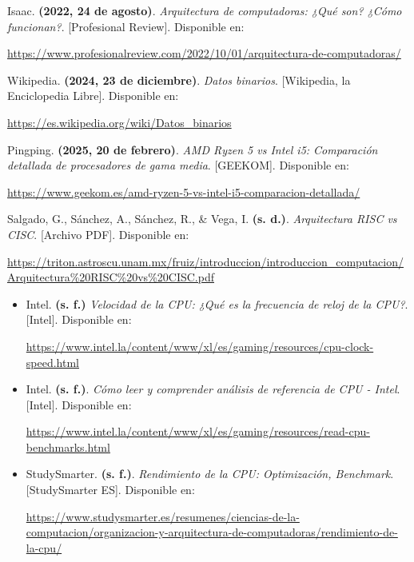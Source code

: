 \documentclass[12pt,letterpaper]{article}
\begin{document}
\begin{thebibliography}{9}

  Isaac. \textbf{(2022, 24 de agosto)}. \textit{Arquitectura de computadoras: ¿Qué son? ¿Cómo funcionan?}. [Profesional Review]. Disponible en:

  \url{https://www.profesionalreview.com/2022/10/01/arquitectura-de-computadoras/}
  
  Wikipedia. \textbf{(2024, 23 de diciembre)}. \textit{Datos binarios}. [Wikipedia, la Enciclopedia Libre]. Disponible en:

  \url{https://es.wikipedia.org/wiki/Datos_binarios}

  Pingping. \textbf{(2025, 20 de febrero)}. \textit{AMD Ryzen 5 vs Intel i5: Comparación detallada de procesadores de gama media}. [GEEKOM]. Disponible en:

  \url{https://www.geekom.es/amd-ryzen-5-vs-intel-i5-comparacion-detallada/}

  Salgado, G., Sánchez, A., Sánchez, R., \& Vega, I. \textbf{(s. d.)}. \textit{Arquitectura RISC vs CISC}. [Archivo PDF]. Disponible en:

  \url{https://triton.astroscu.unam.mx/fruiz/introduccion/introduccion_computacion/Arquitectura\%20RISC\%20vs\%20CISC.pdf}

  \begin{itemize}
  \item Intel. \textbf{(s. f.)} \textit{Velocidad de la CPU: ¿Qué es la frecuencia de reloj de la CPU?}. [Intel]. Disponible en:
    
    \url{https://www.intel.la/content/www/xl/es/gaming/resources/cpu-clock-speed.html}
    
  \item Intel. \textbf{(s. f.)}. \textit{Cómo leer y comprender análisis de referencia de CPU - Intel}. [Intel]. Disponible en:
    
    \url{https://www.intel.la/content/www/xl/es/gaming/resources/read-cpu-benchmarks.html}
    
  \item StudySmarter. \textbf{(s. f.)}. \textit{Rendimiento de la CPU: Optimización, Benchmark}. [StudySmarter ES]. Disponible en:
    
    \url{https://www.studysmarter.es/resumenes/ciencias-de-la-computacion/organizacion-y-arquitectura-de-computadoras/rendimiento-de-la-cpu/}
  \end{itemize}


\end{thebibliography}
\end{document}
